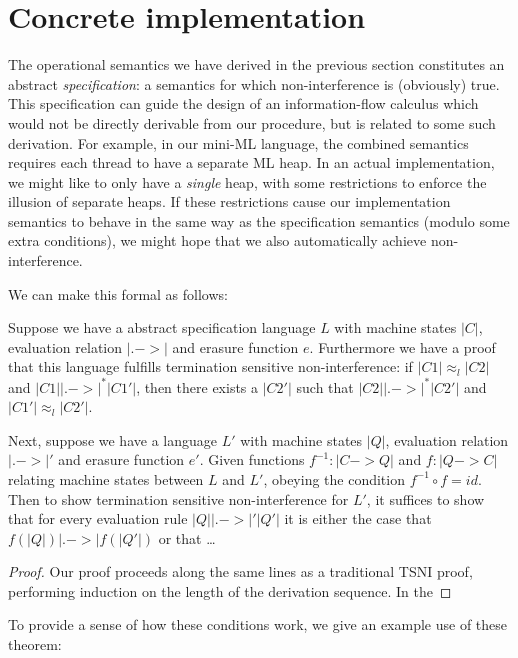 \section{Concrete implementation}
\label{sec:concrete}

The operational semantics we have derived in the previous section
constitutes an abstract \emph{specification}: a semantics for which
non-interference is (obviously) true.  This specification can guide the
design of an information-flow calculus which would not be directly
derivable from our procedure, but is related to some such derivation.
For example, in our mini-ML language, the combined semantics requires
each thread to have a separate ML heap.  In an actual implementation, we
might like to only have a \emph{single} heap, with some restrictions to
enforce the illusion of separate heaps.  If these restrictions cause our
implementation semantics to behave in the same way as the specification
semantics (modulo some extra conditions), we might hope that we also
automatically achieve non-interference.

We can make this formal as follows: 

\begin{theorem}
    Suppose we have a abstract specification language $L$ with machine
    states $|C|$, evaluation relation $|.->|$ and erasure function $e$.
    Furthermore we have a proof that this language fulfills termination
    sensitive non-interference: if $|C1| \approx_l |C2|$ and $|C1|
    |.->|^* |C1'|$, then there exists a $|C2'|$ such that $|C2| |.->|^*
    |C2'|$ and $|C1'| \approx_l |C2'|$.

    Next, suppose we have a language $L'$ with machine states $|Q|$,
    evaluation relation $|.->|'$ and erasure function $e'$.  Given
    functions $f^{-1} : |C -> Q|$ and $f : |Q -> C|$ relating machine
    states between $L$ and $L'$, obeying the condition $f^{-1} \circ f =
    id$.  Then to show termination sensitive non-interference for $L'$,
    it suffices to show that for every evaluation rule $|Q| |.->|' |Q'|$
    it is either the case that $f(|Q|) |.->| f(|Q'|)$ or that
    \ldots
\end{theorem}

\begin{proof}
Our proof proceeds along the same lines as a traditional TSNI proof,
performing induction on the length of the derivation sequence.  In the
\end{proof}

To provide a sense of how these conditions work, we give an example
use of these theorem:

